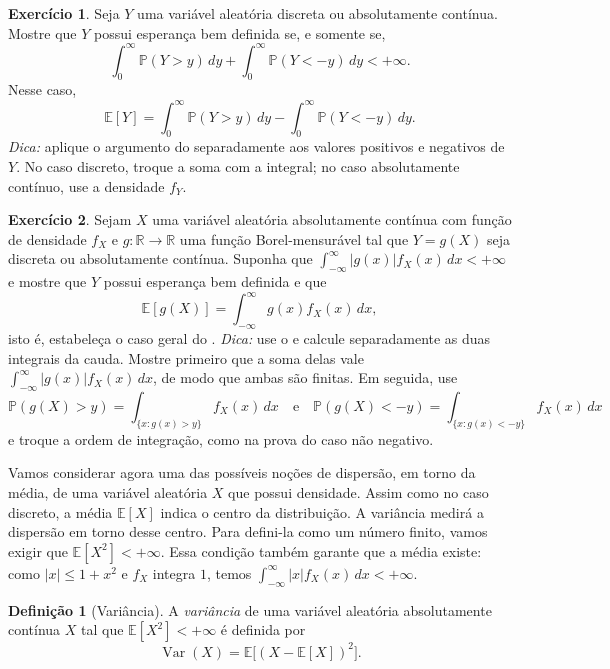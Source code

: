 \documentclass[12pt,portuguese]{article}
\theoremstyle{definition}
\newtheorem{definition}[definition]{Definição}
\theoremstyle{plainexercise}
\newtheorem{exercise}{Exercício}
\theoremstyle{starredexercise}
\theoremstyle{definition}
\begin{document}
\begin{exercise}\label{exercise:cauda-geral}
  Seja $Y$ uma variável aleatória discreta ou absolutamente contínua.
  Mostre que $Y$ possui esperança bem definida se, e somente se,
  \[
    \int_0^\infty\mathbb{P}(Y>y)\,dy
    +\int_0^\infty\mathbb{P}(Y<-y)\,dy<+\infty.
  \]
  Nesse caso,
  \[
    \mathbb{E}[Y]
    = \int_{0}^{\infty} \mathbb{P}(Y > y)\,dy
    - \int_{0}^{\infty} \mathbb{P}(Y < -y)\,dy.
  \]
  \emph{Dica:} aplique o argumento do 
  separadamente aos valores positivos e negativos de $Y$. No caso
  discreto, troque a soma com a integral; no caso absolutamente
  contínuo, use a densidade $f_Y$.
\end{exercise}

\begin{exercise}\label{exercise:lotus-caso-geral}
  Sejam $X$ uma variável aleatória absolutamente contínua com função de densidade $f_X$
  e $g : \mathbb{R} \to \mathbb{R}$ uma função Borel-mensurável tal que
  $Y=g(X)$ seja discreta ou absolutamente contínua. Suponha que
  $\int_{-\infty}^{\infty} |g(x)| f_X(x)\,dx < +\infty$ e mostre que
  $Y$ possui esperança bem definida e que
  \[
    \mathbb{E}[g(X)] = \int_{-\infty}^{\infty} g(x) f_X(x)\,dx,
  \]
  isto é, estabeleça o caso geral do .
  \emph{Dica:} use o  e calcule separadamente
  as duas integrais da cauda. Mostre primeiro que a soma delas vale
  $\int_{-\infty}^{\infty}|g(x)|f_X(x)\,dx$, de modo que ambas são finitas.
  Em seguida, use
  \[
    \mathbb{P}(g(X)>y)=\int_{\{x:g(x)>y\}}f_X(x)\,dx
    \quad\text{e}\quad
    \mathbb{P}(g(X)<-y)=\int_{\{x:g(x)<-y\}}f_X(x)\,dx
  \]
  e troque a ordem de integração, como na prova do caso não negativo.
\end{exercise}


\bigskip

Vamos considerar agora uma das possíveis noções de
dispersão, em torno da média, de uma variável aleatória $X$ que possui densidade.
Assim como no caso discreto, a média $\mathbb{E}[X]$ indica o centro
da distribuição. A variância medirá a dispersão em torno desse centro.
Para defini-la como um número finito, vamos exigir que
$\mathbb{E}[X^2]<+\infty$. Essa condição também garante que a média
existe: como $|x|\leqslant 1+x^2$ e $f_X$ integra $1$, temos
$\int_{-\infty}^{\infty}|x|f_X(x)\,dx<+\infty$.

\begin{definition}[Variância]\label{def:variancia-continua}
  A \emph{variância} de uma variável aleatória absolutamente contínua $X$ tal que
  $\mathbb{E}[X^2]<+\infty$ é definida por
  \begin{equation}\label{eq:def-variancia-continua}
    \operatorname{Var}(X) = \mathbb{E}\big[(X - \mathbb{E}[X])^2\big].
  \end{equation}
\end{definition}
\end{document}
